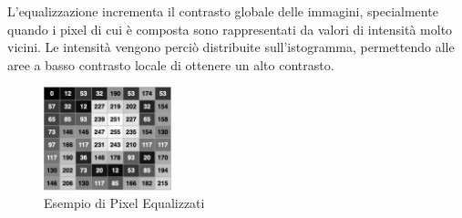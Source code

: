 \documentclass{article}
\begin{document}
L'equalizzazione incrementa il contrasto globale delle immagini, specialmente quando i pixel di cui è composta sono rappresentati da valori di intensità molto vicini. Le intensità vengono perciò distribuite sull'istogramma, permettendo alle aree a basso contrasto locale di ottenere un alto contrasto.\newline
\begin{figure}[h]
\centering
\includegraphics[width=0.33\textwidth]{AfterEq.png}
\caption{Esempio di Pixel Equalizzati}
\end{figure}


\break
\end{document}
